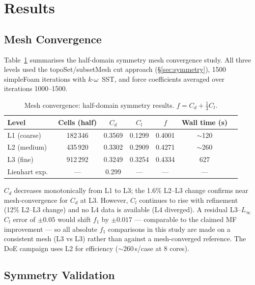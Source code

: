 \section{Results}
\label{sec:results}

\subsection{Mesh Convergence}
\label{sec:mesh_convergence_results}

Table~\ref{tab:convergence_results} summarises the half-domain symmetry mesh convergence study. All three levels used the topoSet/subsetMesh cut approach (\S\ref{sec:symmetry}), 1500 simpleFoam iterations with $k$-$\omega$~SST, and force coefficients averaged over iterations 1000--1500.

\begin{table}[h]
    \centering
    \caption{Mesh convergence: half-domain symmetry results. $f = C_d + \tfrac{1}{3}C_l$.}
    \label{tab:convergence_results}
    \begin{tabular}{lcccccc}
        \toprule
        Level & Cells (half) & $C_d$ & $C_l$ & $f$ & Wall time (s) \\
        \midrule
        L1 (coarse)    & 182\,346  & 0.3569 & 0.1299 & 0.4001 & $\sim$120 \\
        L2 (medium)    & 435\,920  & 0.3302 & 0.2909 & 0.4271 & $\sim$260 \\
        L3 (fine)      & 912\,292  & 0.3249 & 0.3254 & 0.4334 & 627 \\
        \midrule
        Lienhart exp.\ & ---       & 0.299  & ---    & ---    & --- \\
        \bottomrule
    \end{tabular}
\end{table}

$C_d$ decreases monotonically from L1 to L3; the 1.6\% L2--L3 change confirms near mesh-convergence for $C_d$ at L3. However, $C_l$ continues to rise with refinement (12\% L2--L3 change) and no L4 data is available (L4 diverged). A residual L3--$L_\infty$ $C_l$ error of $\pm0.05$ would shift $f_1$ by $\pm0.017$ — comparable to the claimed MF improvement — so all absolute $f_1$ comparisons in this study are made on a consistent mesh (L3 vs L3) rather than against a mesh-converged reference. The DoE campaign uses L2 for efficiency ($\sim$260\,s/case at 8 cores).

\subsection{Symmetry Validation}
\label{sec:symmetry_validation}


